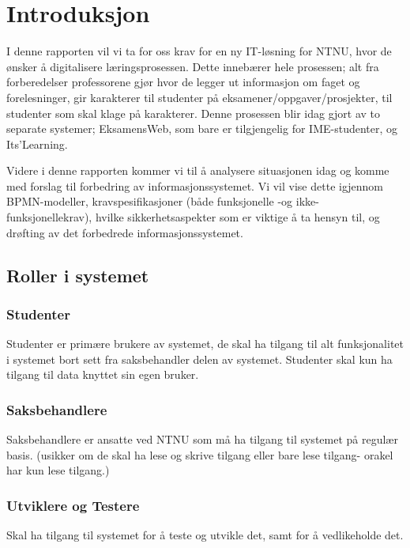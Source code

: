 \documentclass[12pt]{article}
\begin{document}
\newpage
\tableofcontents
\newpage

\section{Introduksjon}

I denne rapporten vil vi ta for oss krav for en ny IT-løsning for NTNU, hvor de ønsker å digitalisere læringsprosessen. Dette innebærer hele prosessen; alt fra forberedelser professorene gjør hvor de legger ut informasjon om faget og forelesninger, gir karakterer til studenter på eksamener/oppgaver/prosjekter, til studenter som skal klage på karakterer. Denne prosessen blir idag gjort av to separate systemer; EksamensWeb, som bare er tilgjengelig for IME-studenter, og Its’Learning. 

Videre i denne rapporten kommer vi til å analysere situasjonen idag og komme med forslag til forbedring av informasjonssystemet. Vi vil vise dette igjennom BPMN-modeller, kravspesifikasjoner (både funksjonelle -og ikke-funksjonellekrav), hvilke sikkerhetsaspekter som er viktige å ta hensyn til, og drøfting av det forbedrede informasjonssystemet.

\subsection{Roller i systemet}

\subsubsection*{Studenter}
Studenter er primære brukere av systemet, de skal ha tilgang til alt funksjonalitet i systemet bort sett fra saksbehandler delen av systemet. Studenter skal kun ha tilgang til data knyttet sin egen bruker.

\subsubsection*{Saksbehandlere}
Saksbehandlere er ansatte ved NTNU som må ha tilgang til systemet på regulær basis. (usikker om de skal ha lese og skrive tilgang eller bare lese tilgang- orakel har kun lese tilgang.)

\subsubsection*{Utviklere og Testere}

Skal ha tilgang til systemet for å teste og utvikle det, samt for å vedlikeholde det.
 
\end{document}
